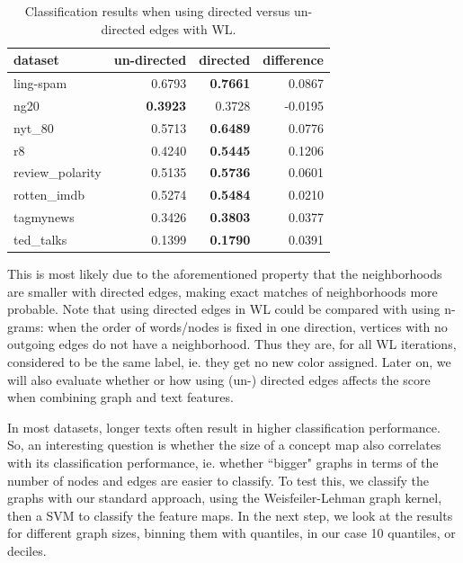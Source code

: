 \begin{table}[htb!]
	\centering
\begin{tabular}{lrrr}
	dataset &  un-directed & directed &  difference \\
	\midrule
	ling-spam       &  0.6793 &  \textbf{0.7661} &  0.0867 \\
	ng20            &  \textbf{0.3923} &  0.3728 & -0.0195 \\
	nyt\_80          &  0.5713 &  \textbf{0.6489} &  0.0776 \\
	r8              &  0.4240 &  \textbf{0.5445} &  0.1206 \\
	review\_polarity &  0.5135 & \textbf{ 0.5736 }&  0.0601 \\
	rotten\_imdb     &  0.5274 &  \textbf{0.5484} &  0.0210 \\
	tagmynews       &  0.3426 &  \textbf{0.3803} &  0.0377 \\
	ted\_talks       &  0.1399 &  \textbf{0.1790} &  0.0391 \\
	\bottomrule
\end{tabular}
\caption[Results: WL with directed and un-directed edges]{Classification results when using directed versus un-directed edges with WL.}\label{table:results_directed_vs_undirected}
\end{table}

This is most likely due to the aforementioned property that the neighborhoods are smaller with directed edges, making exact matches of neighborhoods more probable.
Note that using directed edges in WL could be compared with using n-grams: when the order of words/nodes is fixed in one direction, vertices with no outgoing edges do not have a neighborhood. Thus they are, for all WL iterations, considered to be the same label, ie. they get no new color assigned.
Later on, we will also evaluate whether or how using (un-) directed edges affects the score when combining graph and text features.

In most datasets, longer texts often result in higher classification performance.
So, an interesting question is whether the size of a concept map also correlates with its classification performance, ie. whether ``bigger" graphs in terms of the number of nodes and edges are easier to classify.
To test this, we classify the graphs with our standard approach, using the Weisfeiler-Lehman graph kernel, then a SVM to classify the feature maps.
In the next step, we look at the results for different graph sizes, binning them with quantiles, in our case 10 quantiles, or deciles.

